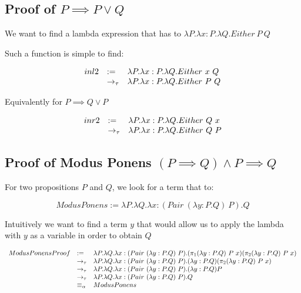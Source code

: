 \subsection{Proof of $P \implies P \vee Q$}

We want to find a lambda expression that has \taureduces to $\lambda P.\lambda x:P.\lambda Q.Either\ P\ Q$

Such a function is simple to find:

\[
\begin{array}{lll}
    inl2 & :=        & \lambda P.\lambda x:P.\lambda Q.Either\ x\ Q \\
        & \totau    & \lambda P.\lambda x:P.\lambda Q.Either\ P\ Q
\end{array}
\]

Equivalently for $P \implies Q \vee P$

\[
\begin{array}{lll}
    inr2 & :=        & \lambda P.\lambda x:P.\lambda Q.Either\ Q\ x \\
        & \totau    & \lambda P.\lambda x:P.\lambda Q.Either\ Q\ P
\end{array}
\]

\subsection{Proof of Modus Ponens $(P \implies Q) \land P \implies Q$}

For two propositions $P$ and $Q$, we look for a term that \taureduces to:

\[
    ModusPonens := \lambda P.\lambda Q.\lambda x:(Pair\ (\lambda y:P.Q)\ P).Q
\]

Intuitively we want to find a term $y$ that would allow us to apply the lambda with $y$ as a variable in order to obtain $Q$

\[
\begin{array}{lll}
    ModusPonensProof    & :=        & \lambda P.\lambda Q.\lambda x:(Pair\ (\lambda y:P.Q)\ P).(\pi_1 (\lambda y:P.Q)\ P\ x) (\pi_2 (\lambda y:P.Q)\ P\ x) \\
                        & \to_\tau    &\lambda P.\lambda Q. \lambda x:(Pair\ (\lambda y:P.Q)\ P).(\lambda y:P.Q) (\pi_2 (\lambda y:P.Q)\ P\ x) \\
                        & \to_\tau    & \lambda P.\lambda Q.\lambda x:(Pair\ (\lambda y:P.Q)\ P).(\lambda y:P.Q) P \\
                        & \to_\tau    & \lambda P.\lambda Q.\lambda x:(Pair\ (\lambda y:P.Q)\ P).Q \\
                        & \equiv_\alpha  & ModusPonens
\end{array}
\]

